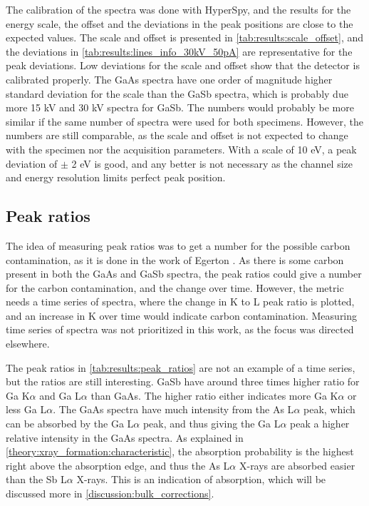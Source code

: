 The calibration of the spectra was done with HyperSpy, and the results for the energy scale, the offset and the deviations in the peak positions are close to the expected values.
The scale and offset is presented in \cref{tab:results:scale_offset}, and the deviations in \cref{tab:results:lines_info_30kV_50pA} are representative for the peak deviations.
Low deviations for the scale and offset show that the detector is calibrated properly.
The GaAs spectra have one order of magnitude higher standard deviation for the scale than the GaSb spectra, which is probably due more 15 kV and 30 kV spectra for GaSb.
The numbers would probably be more similar if the same number of spectra were used for both specimens.
However, the numbers are still comparable, as the scale and offset is not expected to change with the specimen nor the acquisition parameters.
With a scale of 10 eV, a peak deviation of $\pm$ 2 eV is good, and any better is not necessary as the channel size and energy resolution limits perfect peak position.




\subsection{Peak ratios}
\label{discussion:peak_ratios}

The idea of measuring peak ratios was to get a number for the possible carbon contamination, as it is done in the work of Egerton \cite{egerton_nio_characterization_1994}.
As there is some carbon present in both the GaAs and GaSb spectra, the peak ratios could give a number for the carbon contamination, and the change over time.
However, the metric needs a time series of spectra, where the change in K to L peak ratio is plotted, and an increase in K over time would indicate carbon contamination.
Measuring time series of spectra was not prioritized in this work, as the focus was directed elsewhere.

The peak ratios in \cref{tab:results:peak_ratios} are not an example of a time series, but the ratios are still interesting.
GaSb have around three times higher ratio for Ga K$\alpha$ and Ga L$\alpha$ than GaAs.
The higher ratio either indicates more Ga K$\alpha$ or less Ga L$\alpha$.
The GaAs spectra have much intensity from the As L$\alpha$ peak, which can be absorbed by the Ga L$\alpha$ peak, and thus giving the Ga L$\alpha$ peak a higher relative intensity in the GaAs spectra.
As explained in \cref{theory:xray_formation:characteristic}, the absorption probability is the highest right above the absorption edge, and thus the As L$\alpha$ X-rays are absorbed easier than the Sb L$\alpha$ X-rays.
This is an indication of absorption, which will be discussed more in \cref{discussion:bulk_corrections}.



